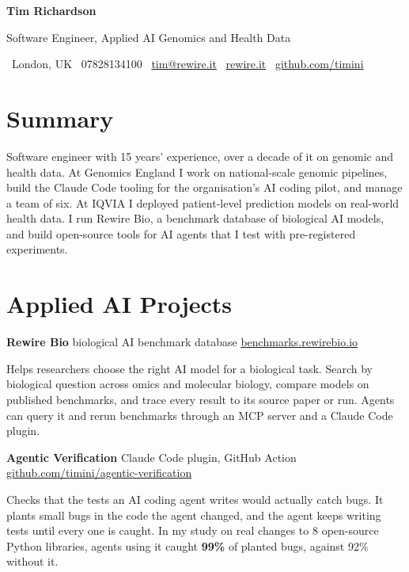 \documentclass[a4paper,10pt]{article}
\newcommand{\gap}{\vspace{8pt}}
\begin{document}
{\fontsize{26}{30}\selectfont\bfseries Tim Richardson}\par
\vspace{2pt}
{\large\color{accent} Software Engineer, Applied AI \textbullet{} Genomics and Health Data}\par
\vspace{8pt}
{\small\color{muted}
\faMapMarker*\ London, UK \quad
\faPhone*\ 07828134100 \quad
\faEnvelope[regular]\ \href{mailto:tim@rewire.it}{tim@rewire.it} \quad
\faGlobe\ \href{https://rewire.it}{rewire.it} \quad
\faGithub\ \href{https://github.com/timini}{github.com/timini}}

\section{Summary}
Software engineer with 15 years' experience, over a decade of it on genomic and health data. At Genomics England I work on national-scale genomic pipelines, build the Claude Code tooling for the organisation's AI coding pilot, and manage a team of six. At IQVIA I deployed patient-level prediction models on real-world health data. I run Rewire Bio, a benchmark database of biological AI models, and build open-source tools for AI agents that I test with pre-registered experiments.

\section{Applied AI Projects}

\textbf{Rewire Bio} {\color{muted}\small biological AI benchmark database} \hfill {\small\href{https://benchmarks.rewirebio.io}{\color{accent}benchmarks.rewirebio.io}}\par
Helps researchers choose the right AI model for a biological task. Search by biological question across omics and molecular biology, compare models on published benchmarks, and trace every result to its source paper or run. Agents can query it and rerun benchmarks through an MCP server and a Claude Code plugin.
\gap

\textbf{Agentic Verification} {\color{muted}\small Claude Code plugin, GitHub Action} \hfill {\small\href{https://github.com/timini/agentic-verification}{\color{accent}github.com/timini/agentic-verification}}\par
Checks that the tests an AI coding agent writes would actually catch bugs. It plants small bugs in the code the agent changed, and the agent keeps writing tests until every one is caught. In my study on real changes to 8 open-source Python libraries, agents using it caught \textbf{99\%} of planted bugs, against 92\% without it.
\gap
\end{document}
